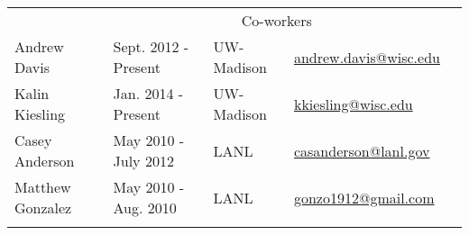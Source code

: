 \begin{longtable}{lllll}
               
				                   

              & \multicolumn{3}{c}{\Large{Co-workers}} &  \\  \vspace{2mm}

	      {Andrew Davis}\label{andy} & {Sept. 2012 - Present} &
	      {UW-Madison} &
	      \href{mailto:andrew.davis@wisc.edu}{andrew.davis@wisc.edu} \\
	      \vspace{2mm}
{Kalin Kiesling}\label{kk} & {Jan. 2014 - Present} & {UW-Madison}  &
	\href{mailto:kkiesling@wisc.edu}{kkiesling@wisc.edu} \\ \vspace{2mm}  %

{Casey Anderson}\label{cas} & {May 2010 - July 2012} & {LANL}&
\href{mailto:casanderson@lanl.com}{casanderson@lanl.gov} \\ \vspace{2mm}%

{Matthew Gonzalez}\label{matt_gonzo} & {May 2010 - Aug. 2010} & {LANL} &
	\href{mailto:gonzo1912@gmail.com}{gonzo1912@gmail.com} \\ \vspace{2mm}%
     


\vspace{-12mm} %
\end{longtable}







